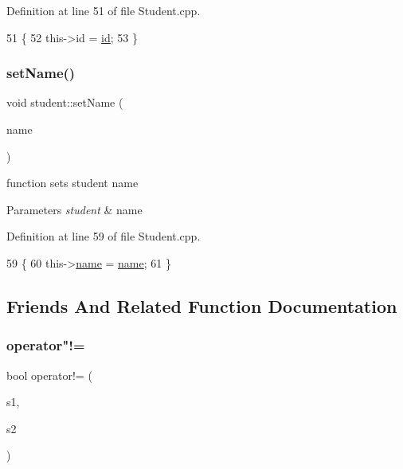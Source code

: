 Definition at line 51 of file Student.\+cpp.


\begin{DoxyCode}
51                           \{
52     this->\textcolor{keywordtype}{id} = \hyperlink{classstudent_a8215d11b0d1adc77e0808a0ff4d0f6a2}{id};
53 \}
\end{DoxyCode}
\mbox{\label{classstudent_a9e5279d275d68557215edd499c15b0a2}} 
\subsubsection{\texorpdfstring{set\+Name()}{setName()}}
{\footnotesize\ttfamily void student\+::set\+Name (\begin{DoxyParamCaption}\item[{const std\+::string \&}]{name }\end{DoxyParamCaption})}

function sets student name 
\begin{DoxyParams}{Parameters}
{\em student} & name \\
\hline
\end{DoxyParams}


Definition at line 59 of file Student.\+cpp.


\begin{DoxyCode}
59                                            \{
60     this->\hyperlink{classstudent_a8bba46a454eaecf8619a68c4c38c7b8d}{name} = \hyperlink{classstudent_a8bba46a454eaecf8619a68c4c38c7b8d}{name};
61 \}
\end{DoxyCode}


\subsection{Friends And Related Function Documentation}
\mbox{\label{classstudent_aaaddafca542c39f7442b1807ba5600c3}} 
\subsubsection{\texorpdfstring{operator"!=}{operator!=}}
{\footnotesize\ttfamily bool operator!= (\begin{DoxyParamCaption}\item[{const \hyperlink{classstudent}{student} \&}]{s1,  }\item[{const \hyperlink{classstudent}{student} \&}]{s2 }\end{DoxyParamCaption})\hspace{0.3cm}{\ttfamily [friend]}}


